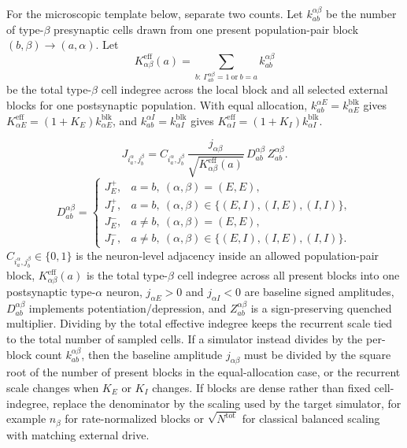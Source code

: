 For the microscopic template below, separate two counts. Let
\(k_{ab}^{\alpha\beta}\) be the number of type-\(\beta\) presynaptic cells drawn
from one present population-pair block \((b,\beta)\to(a,\alpha)\). Let
\begin{equation}
    K_{\alpha\beta}^{\mathrm{eff}}(a)
    =
    \sum_{b:\,\Gamma_{ab}^{\alpha\beta}=1\ \mathrm{or}\ b=a}
    k_{ab}^{\alpha\beta}
    \label{eq:ch08-effective-cell-indegree}
\end{equation}
be the total type-\(\beta\) cell indegree across the local block and all selected
external blocks for one postsynaptic population. With equal allocation,
\(k_{ab}^{\alpha E}=k_{\alpha E}^{\mathrm{blk}}\) gives
\(K_{\alpha E}^{\mathrm{eff}}=(1+K_E)k_{\alpha E}^{\mathrm{blk}}\), and
\(k_{ab}^{\alpha I}=k_{\alpha I}^{\mathrm{blk}}\) gives
\(K_{\alpha I}^{\mathrm{eff}}=(1+K_I)k_{\alpha I}^{\mathrm{blk}}\).

\begin{keyequation}
\begin{equation}
    J_{i_a^\alpha,j_b^\beta}
    =
    C_{i_a^\alpha,j_b^\beta}\,
    \frac{j_{\alpha\beta}}{\sqrt{K_{\alpha\beta}^{\mathrm{eff}}(a)}}\,
    D_{ab}^{\alpha\beta}\,
    Z_{ab}^{\alpha\beta}.
    \label{eq:ch08-canonical-microscopic-weight}
\end{equation}
\begin{equation}
    D_{ab}^{\alpha\beta}
    =
    \begin{cases}
      J_E^+, & a=b,\ (\alpha,\beta)=(E,E),\\
      J_I^+, & a=b,\ (\alpha,\beta)\in\{(E,I),(I,E),(I,I)\},\\
      J_E^-, & a\ne b,\ (\alpha,\beta)=(E,E),\\
      J_I^-, & a\ne b,\ (\alpha,\beta)\in\{(E,I),(I,E),(I,I)\}.
    \end{cases}
    \label{eq:ch08-canonical-multipliers}
\end{equation}
\tcblower
\(C_{i_a^\alpha,j_b^\beta}\in\{0,1\}\) is the neuron-level adjacency inside an
allowed population-pair block, \(K_{\alpha\beta}^{\mathrm{eff}}(a)\) is the
total type-\(\beta\) cell indegree across all present blocks into one
postsynaptic type-\(\alpha\) neuron, \(j_{\alpha E}>0\) and \(j_{\alpha I}<0\)
are baseline signed amplitudes, \(D_{ab}^{\alpha\beta}\) implements
potentiation/depression, and \(Z_{ab}^{\alpha\beta}\) is a sign-preserving
quenched multiplier. Dividing by the total effective indegree keeps the
recurrent scale tied to the total number of sampled cells. If a simulator
instead divides by the per-block count \(k_{ab}^{\alpha\beta}\), then the
baseline amplitude \(j_{\alpha\beta}\) must be divided by the square root of the
number of present blocks in the equal-allocation case, or the recurrent scale
changes when \(K_E\) or \(K_I\) changes. If blocks
are dense rather than fixed cell-indegree, replace the denominator by the
scaling used by the target simulator, for example \(n_\beta\) for
rate-normalized blocks or \(\sqrt{N^{\mathrm{tot}}}\) for classical balanced
scaling with matching external drive.
\end{keyequation}

